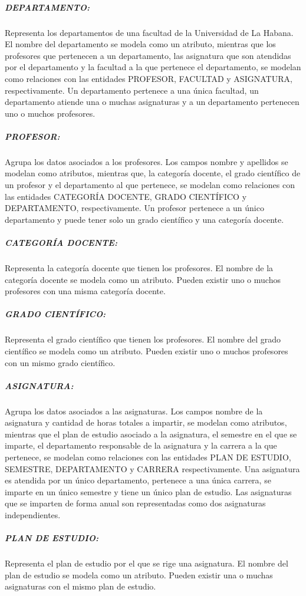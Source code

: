 \subparagraph{DEPARTAMENTO:}
Representa los departamentos de una facultad de la Universidad de La Habana.
El nombre del departamento se modela como un atributo, mientras que los profesores que 
pertenecen a un departamento, las asignatura que son atendidas por el departamento y la 
facultad a la que pertenece el departamento, se modelan como relaciones con las entidades 
PROFESOR, FACULTAD y ASIGNATURA, respectivamente. Un departamento pertenece a una única facultad,
un departamento atiende una o muchas asignaturas y a un departamento pertenecen uno o muchos 
profesores.

\subparagraph{PROFESOR:}
Agrupa los datos asociados a los profesores.
Los campos nombre y apellidos se modelan como atributos,  
mientras que, la categoría docente, el grado 
científico de un profesor y el departamento al que pertenece, se modelan como 
relaciones con las entidades CATEGORÍA DOCENTE, GRADO CIENTÍFICO y 
DEPARTAMENTO, respectivamente. Un profesor pertenece a un único departamento y puede tener solo 
un grado científico y una categoría docente. 


\subparagraph{CATEGORÍA DOCENTE:}
Representa la categoría docente que tienen los profesores.
El nombre de la categoría docente se modela como un atributo. 
Pueden existir uno o muchos profesores con una misma categoría docente.

\subparagraph{GRADO CIENTÍFICO:}
Representa el grado científico que tienen los profesores.
El nombre del grado científico se modela como un atributo.
Pueden existir uno o muchos profesores con un mismo grado científico.





\subparagraph{ASIGNATURA:}
Agrupa los datos asociados a las asignaturas.
Los campos nombre de la asignatura y cantidad de horas 
totales a impartir, se modelan como atributos, mientras que
el plan de estudio asociado a la asignatura, el semestre en el que se 
imparte, el departamento responsable de la asignatura y la carrera a la 
que pertenece, se modelan como relaciones con las entidades
PLAN DE ESTUDIO, SEMESTRE, DEPARTAMENTO y CARRERA respectivamente. Una asignatura 
es atendida por un único departamento, pertenece a una única carrera, se imparte en un 
único semestre y tiene un único plan de estudio. Las asignaturas que se imparten de forma 
anual son representadas como dos asignaturas independientes.

\subparagraph{PLAN DE ESTUDIO:}
Representa el plan de estudio por el que se rige una asignatura.
El nombre del plan de estudio se modela como un atributo.
Pueden existir una o muchas asignaturas con el mismo plan de estudio.



